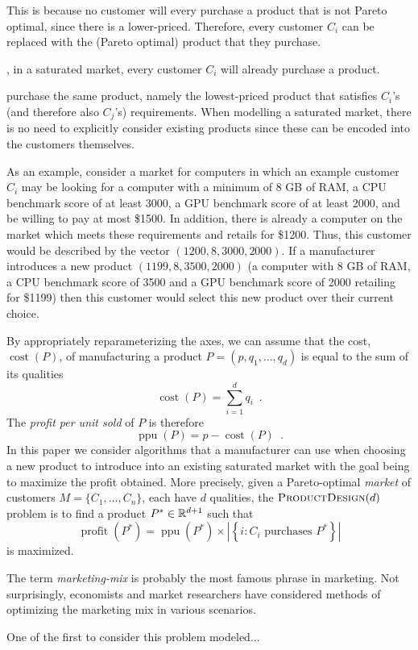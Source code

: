 \documentclass[lotsofwhite]{patmorin}
\newcommand{\cost}{\operatorname{cost}}
\newcommand{\ppu}{\operatorname{ppu}}
\newcommand{\val}{\operatorname{profit}}
\begin{document}
This is because no customer will every purchase a product that is not
Pareto optimal, since there is a lower-priced. Therefore, every customer $C_i$ can be replaced with the
(Pareto optimal) product that they purchase.

, in a saturated market, every customer $C_i$ will already
purchase a product.


purchase the same product, namely the lowest-priced product that satisfies
$C_i$'s (and therefore also $C_j$'s) requirements.  When modelling a
saturated market, there is no need to explicitly consider existing products
since these can be encoded into the customers themselves.

As an example, consider a market for computers in which an example customer
$C_i$ may be looking for a computer with a minimum of 8 GB of RAM, a CPU
benchmark score of at least 3000, a GPU benchmark score of at least 2000,
and be willing to pay at most \$1500.  In addition, there is already a
computer on the market which meets these requirements and retails for
\$1200.  Thus, this customer would be described by the vector
$(1200,8,3000,2000)$.  If a manufacturer introduces a new product
$(1199,8,3500,2000)$ (a computer with 8 GB of RAM, a CPU benchmark score of
3500 and a GPU benchmark score of 2000 retailing for \$1199) then this
customer would select this new product over their current choice.

By appropriately reparameterizing the axes, we can assume that the cost,
$\cost(P)$, of manufacturing a product $P=(p,q_1,\ldots,q_d)$ is equal to
the sum of its qualities
\[
   \cost(P) = \sum_{i=1}^d q_i \enspace .
\]
The \emph{profit per unit sold} of $P$ is therefore
\[
   \ppu(P) = p-\cost(P) \enspace .
\]
In this paper we consider algorithms that a manufacturer can use when
choosing a new product to introduce into an existing saturated market
with the goal being to maximize the profit obtained.  More precisely,
given a Pareto-optimal \emph{market} of customers $M=\{C_1,\ldots,C_n\}$,
each have $d$ qualities, the $\textsc{ProductDesign}(d)$ problem is to
find a product $P^*\in\mathbb{R}^{d+1}$ such that
\[
  \val(P^*) = \ppu(P^*)
    \times 
      \left| \left\{ i:\mbox{$C_i$ purchases $P^*$} \right\} \right|
\]
is maximized.  

The term \emph{marketing-mix} is probably the most famous phrase in
marketing. Not surprisingly, economists and market researchers have
considered methods of optimizing the marketing mix in various
scenarios.  

One of the first to consider this problem modeled...
\end{document}
